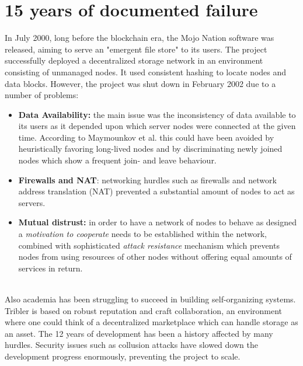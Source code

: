 \documentclass[conference]{IEEEtran}
\begin{document}
\section{15 years of documented failure}
\label{sec:documented-failure}

In July 2000, long before the blockchain era, the Mojo Nation software \cite{mojo-nation} was released, aiming to serve an "emergent file store" to its users.
The project successfully deployed a decentralized storage network in an environment consisting of unmanaged nodes.
It used consistent hashing \cite{consistent-hashing} to locate nodes and data blocks.
However, the project was shut down in February 2002 due to a number of problems:
\begin{itemize}
\item \textbf{Data Availability:} the main issue was the inconsistency of data available to its users as it depended upon which server nodes were connected at the given time.
According to Maymounkov et al.\cite{peer-to-peer-xor} this could have been avoided by heuristically favoring long-lived nodes and by discriminating newly joined nodes which show a frequent join- and leave behaviour.
\item \textbf{Firewalls and NAT}: networking hurdles such as firewalls and network address translation (NAT) prevented a substantial amount of nodes to act as servers.
\item \textbf{Mutual distrust:} in order to have a network of nodes to behave as designed a \textit{motivation to cooperate} needs to be established within the network, combined with sophisticated \textit{attack resistance} mechanism which prevents nodes from using resources of other nodes without offering equal amounts of services in return.
\end{itemize}
\hfill
\\
Also academia has been struggling to succeed in building self-organizing systems.
Tribler\cite{tribler} is based on robust reputation and craft collaboration, an environment where one could think of a decentralized marketplace which can handle storage as an asset.
The 12 years of development has been a history affected by many hurdles.
Security issues such as collusion attacks\cite{tribler-hurdles} have slowed down the development progress enormously, preventing the project to scale.
\end{document}
